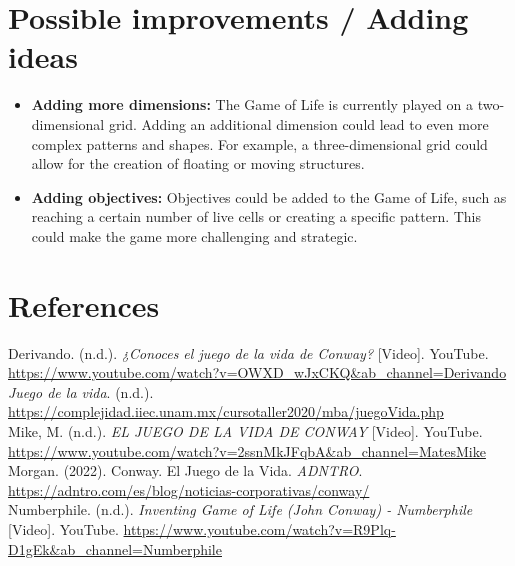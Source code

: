 \documentclass[12pt]{article}
\begin{document}
  \section*{Possible improvements / Adding ideas}
  \begin{itemize}
    \item \textbf{Adding more dimensions:} The Game of Life is currently played on a two-dimensional grid. Adding an additional dimension could lead to even more complex patterns and shapes. For example, a three-dimensional grid could allow for the creation of floating or moving structures.
    \item \textbf{Adding objectives:} Objectives could be added to the Game of Life, such as reaching a certain number of live cells or creating a specific pattern. This could make the game more challenging and strategic.
  \end{itemize}

  \section*{References}
  Derivando. (n.d.). \textit{¿Conoces el juego de la vida de Conway?} [Video]. YouTube. \url{https://www.youtube.com/watch?v=OWXD_wJxCKQ&ab_channel=Derivando} \\

  \textit{Juego de la vida}. (n.d.). \url{https://complejidad.iiec.unam.mx/cursotaller2020/mba/juegoVida.php} \\

  Mike, M. (n.d.). \textit{EL JUEGO DE LA VIDA DE CONWAY} [Video]. YouTube. \url{https://www.youtube.com/watch?v=2ssnMkJFqbA&ab_channel=MatesMike} \\

  Morgan. (2022). Conway. El Juego de la Vida. \textit{ADNTRO}. \url{https://adntro.com/es/blog/noticias-corporativas/conway/} \\

  Numberphile. (n.d.). \textit{Inventing Game of Life (John Conway) - Numberphile} [Video]. YouTube. \url{https://www.youtube.com/watch?v=R9Plq-D1gEk&ab_channel=Numberphile}
\end{document}
